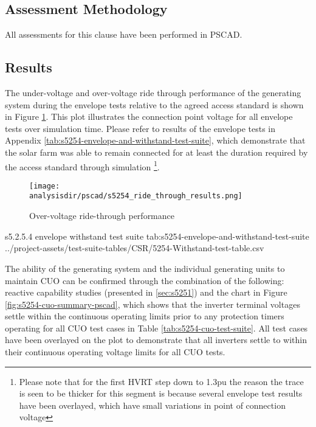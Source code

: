 \documentclass{../grid-link-report}
\newcommand{\projectassetsdir}{../project-assets}
\newcommand{\analysisdir}{report-assets/analysis}
\begin{document}
	\subsection{Assessment Methodology}
	\label{s5254-method}
	
	
	All assessments for this clause have been performed in PSCAD.
	
	\subsection{Results}
	The under-voltage and over-voltage ride through performance of the generating system during the envelope tests relative to the agreed access standard is shown in Figure \ref{fig:s5254_ride_through_results}. This plot illustrates the connection point voltage for all envelope tests over simulation time. Please refer to results of the envelope tests in Appendix \ref{tab:s5254-envelope-and-withstand-test-suite}, which demonstrate that the solar farm was able to remain connected for at least the duration required by the access standard through simulation \footnote{Please note that for the first HVRT step down to 1.3pu the reason the trace is seen to be thicker for this segment is because several envelope test results have been overlayed, which have small variations in point of connection voltage}.

	
	\begin{figure}[H]
		\centering
		\texttt{[image: \\analysisdir/pscad/s5254\_ride\_through\_results.png]}
		\caption{Over-voltage ride-through performance}
		\label{fig:s5254_ride_through_results}
	\end{figure}
	

	{
		\fontsize{7}{9}\selectfont
		\autoscaledlongtable
		{s5.2.5.4 envelope withstand test suite}
		{tab:s5254-envelope-and-withstand-test-suite}
		{\projectassetsdir/test-suite-tables/CSR/5254-Withstand-test-table.csv}
	}
	
	The ability of the generating system and the individual generating units to maintain \ac{CUO} can be confirmed through the combination of the following: reactive capability studies (presented in \ref{sec:s5251}) and the chart in Figure \ref{fig:s5254-cuo-summary-pscad}, which shows that the inverter terminal voltages settle within the continuous operating limits prior to any protection timers operating for all \ac{CUO} test cases in Table \ref{tab:s5254-cuo-test-suite}. All test cases have been overlayed on the plot to demonstrate that all inverters settle to within their continuous operating voltage limits for all \ac{CUO} tests.
\end{document}
